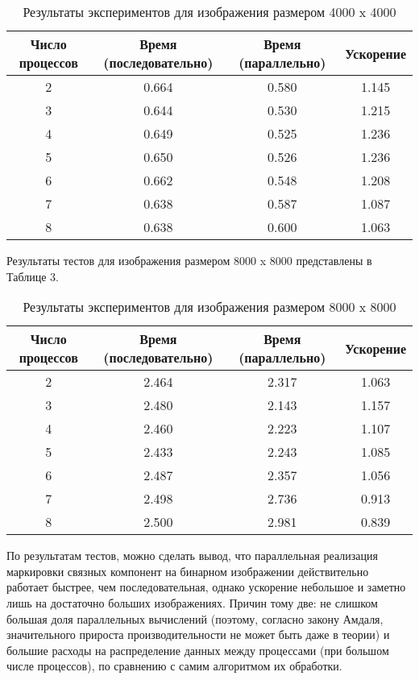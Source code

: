 \documentclass{report}
\begin{document}
	\begin{table}[!h]
		\caption{Результаты экспериментов для изображения размером 4000 x 4000}
		\centering
		\begin{tabular}{|c|c|c|c|}
            \hline
			Число процессов & Время (последовательно) & Время (параллельно) & Ускорение  \\
            \hline
			2        & 0.664           & 0.580       & 1.145      \\
			3        & 0.644           & 0.530       & 1.215      \\
			4        & 0.649           & 0.525       & 1.236      \\
			5        & 0.650           & 0.526       & 1.236      \\
			6        & 0.662           & 0.548       & 1.208      \\
			7        & 0.638           & 0.587       & 1.087      \\
			8        & 0.638           & 0.600       & 1.063      \\
            \hline
		\end{tabular}
	\end{table}
	\par Результаты тестов для изображения размером 8000 x 8000 представлены в Таблице 3.
	\begin{table}[!h]
		\caption{Результаты экспериментов для изображения размером 8000 x 8000}
		\centering
		\begin{tabular}{|c|c|c|c|}
            \hline
			Число процессов & Время (последовательно) & Время (параллельно) & Ускорение  \\
            \hline
			2        & 2.464           & 2.317       & 1.063      \\
			3        & 2.480           & 2.143       & 1.157      \\
			4        & 2.460           & 2.223       & 1.107      \\
			5        & 2.433           & 2.243       & 1.085      \\
			6        & 2.487           & 2.357       & 1.056      \\
			7        & 2.498           & 2.736       & 0.913      \\
			8        & 2.500           & 2.981       & 0.839      \\
            \hline
		\end{tabular}
	\end{table}
	\par По результатам тестов, можно сделать вывод, что параллельная реализация маркировки связных компонент на бинарном изображении действительно работает быстрее, чем последовательная, однако ускорение небольшое и заметно лишь на достаточно больших изображениях. Причин тому две: не слишком большая доля параллельных вычислений (поэтому, согласно закону Амдаля, значительного прироста производительности не может быть даже в теории) и большие расходы на распределение данных между процессами (при большом числе процессов), по сравнению с самим алгоритмом их обработки.
\end{document}
